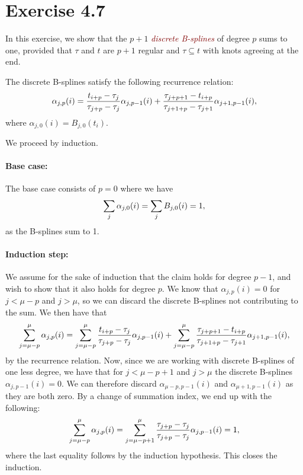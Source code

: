 \documentclass{article}
\let\oldemph\emph
\renewcommand{\emph}[1]{\textcolor{Maroon}{\oldemph{#1}}}
\begin{document}
    \section*{Exercise 4.7}
    In this exercise, we show that the $p+1$ \emph{discrete B-splines} of
    degree $p$ sums to one, provided that $\tau$ and $t$ are $p+1$ regular and
    $\tau \subseteq t$ with knots agreeing at the end.

    \begin{recall}
        The discrete B-splines satisfy the following recurrence relation:
        \begin{equation}
            \notag
            \alpha_{j, p}(i) = \frac{t_{i+p} - \tau_j}{\tau_{j+p} - \tau_j}
            \alpha_{j, p-1}(i) + \frac{\tau_{j+p+1}-t_{i+p}}{\tau_{j+1+p}
            -\tau_{j+1}}\alpha_{j+1, p-1}(i),
        \end{equation}
        where $\alpha_{j, 0}(i) = B_{j, 0}(t_i)$.
    \end{recall}
    We proceed by induction.
    \paragraph{Base case:} The base case consists of $p = 0$ where we have
    \begin{equation}
        \notag
        \sum_{j} \alpha_{j, 0}(i) = \sum_{j} B_{j, 0}(i) = 1,
    \end{equation}
    as the B-splines sum to 1.
    
    \paragraph{Induction step:}
    We assume for the sake of induction that the claim holds for degree $p-1$,
    and wish to show that it also holds for degree $p$. We know that
    $\alpha_{j, p}(i) = 0$ for $j < \mu - p$ and $j > \mu$, so we can discard
    the discrete B-splines not contributing to the sum. We then have that
    \begin{equation}
        \notag
        \sum_{j = \mu - p}^{\mu} \alpha_{j, p}(i) = \sum_{j= \mu - p}^{\mu}
        \frac{t_{i+p} - \tau_j}{\tau_{j+p} - \tau_j} \alpha_{j, p-1}(i) +
        \sum_{j=\mu - p}^{\mu} \frac{\tau_{j+p+1}-t_{i+p}}{\tau_{j+1+p}
        -\tau_{j+1}}\alpha_{j+1, p-1}(i),
    \end{equation}
    by the recurrence relation. Now, since we are working with discrete
    B-splines of one less degree, we have that for $j < \mu - p + 1$ and $j >
    \mu$ the discrete B-splines $\alpha_{j, p-1}(i) = 0$. We can therefore
    discard $\alpha_{\mu - p, p-1}(i)$ and $\alpha_{\mu + 1, p-1}(i)$ as they
    are both zero. By a change of summation index, we end up with the following:
    \begin{equation}
        \notag
        \sum_{j=\mu - p}^\mu \alpha_{j, p}(i) = \sum^{\mu}_{j=\mu - p + 1}
        \frac{\tau_{j+p} - \tau_{j}}{\tau_{j+p} - \tau_{j}} \alpha_{j, p-1}(i) =
        1,
    \end{equation}
    where the last equality follows by the induction hypothesis. This closes
    the induction.
    
\end{document}
